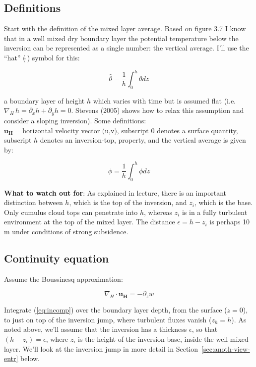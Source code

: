 \documentclass[12pt]{article}
\newcommand{\vect}[1]{\mathbf{{#1}}}
\begin{document}
\subsection{Definitions}

Start with the definition of the mixed layer average.  Based on figure
3.7 I know that in a well mixed dry boundary layer the potential
temperature below the inversion can be represented as a single number:
the vertical average.  I'll use the ``hat'' ($\widehat{\ }$) symbol
for this:

\begin{equation}
  \label{eq:vertavg}
  \widehat{\theta} = \frac{1}{h} \int_0^h \theta dz
\end{equation}


a boundary layer of height $h$ which varies with time but is assumed
flat (i.e. $\nabla_H\,h = \partial_x h + \partial_y h = 0$. Stevens (2005)
shows how to relax this assumption and consider a sloping inversion).  Some
definitions: $\vect{u_H}=\mbox{horizontal velocity vector (u,v)}$,
subscript $0$ denotes a surface quantity, subscript $h$ denotes an
inversion-top,  property, and the vertical average is given by:

\begin{equation}
  \label{eq:vertavgphi}
  \widehat{\phi} = \frac{1}{h} \int_0^h \phi dz
\end{equation}


\textbf{What to watch out for}:  As explained in lecture, there is an important distinction
between $h$, which is the top of the inversion, and $z_i$, which
is the base.  Only cumulus cloud tops can penetrate into $h$, whereas
$z_i$ is in a fully turbulent environment at the top of the mixed
layer.  The distance $\epsilon=h - z_i$ is perhaps 10 m under conditions
of strong subsidence.



\subsection{Continuity equation}
\label{sec:continuity}

Assume the Boussinesq approximation:

\begin{equation}
  \label{eq:incomp}
\nabla_H \cdot \vect{u_H} =  -\partial_z w
\end{equation}

Integrate (\ref{eq:incomp}) over the boundary layer depth, from the surface ($z=0$), to
just on top of the inversion jump, where turbulent fluxes vanish ($z_h = h$).  As noted above,
we'll assume
that the inversion has a thickness $\epsilon$, so that $(h - z_i) = \epsilon$, where $z_i$ is the
height of the inversion base, inside the well-mixed layer.  We'll look at the inversion jump
in more detail in Section~\ref{sec:anoth-view-entr} below.
\end{document}
